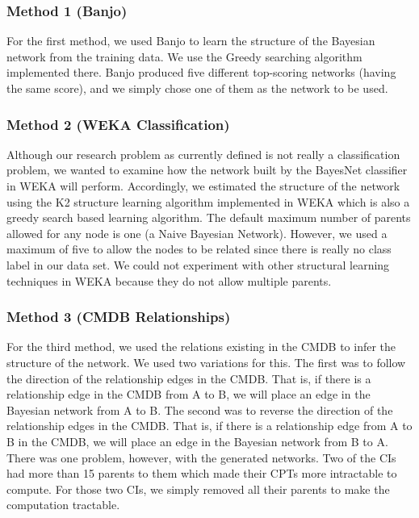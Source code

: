 \documentclass[10pt,twocolumn,letterpaper]{article}
\begin{document}
\subsubsection{Method 1 (Banjo)}
\label{sec:model1}

For the first method, we used Banjo to learn the structure of the Bayesian network from the training data. We use the Greedy searching algorithm implemented
there. Banjo produced five different top-scoring networks (having the same score), and we simply chose one of them as the network to be used.

\subsubsection{Method 2 (WEKA Classification)}

Although our research problem as currently defined is not really a classification problem, we wanted to examine how the network built by the BayesNet classifier
in WEKA will perform. Accordingly, we estimated the structure of the network using the K2 structure learning algorithm implemented in WEKA which is also a
greedy
search based learning algorithm. The default maximum number of parents allowed for any node is one (a Naive Bayesian Network). However, we used a maximum of
five to allow the nodes to be related since there is really no class label in our data set. We could not experiment with other structural learning techniques in
WEKA because they
do not allow multiple parents.

\subsubsection{Method 3 (CMDB Relationships)}

For the third method, we used the relations existing in the CMDB to infer the structure of the network. We used two
variations for this. The first was to follow the direction of the relationship edges in the CMDB. That is, if there is a relationship edge in the CMDB from A to
B, we will place an
edge in the Bayesian network from A to B. The second was to reverse the direction of the relationship edges in the CMDB. That is,
if there is a relationship edge from A to B in the CMDB, we will place an edge in the Bayesian network from B to A. There was one problem, however, with
the generated networks. Two of the CIs had more than 15 parents to them which made their CPTs more intractable to compute. For those two CIs, we simply
removed all their parents to make the computation tractable.
\end{document}
